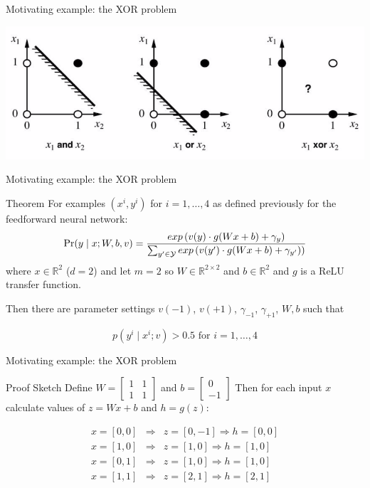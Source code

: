 \begin{frame}{Motivating example: the XOR problem}
\begin{block}{}
\includegraphics[scale=0.7]{figures/xorfig.png}
\end{block}
\end{frame}

\begin{frame}{Motivating example: the XOR problem}
\begin{block}{Theorem}
For examples $(x^i, y^i)$ for $i = 1,\ldots,4$ as defined previously for the feedforward neural network:
\[ \Pr(y \mid x; W, b, v) = \frac{exp\left(v(y) \cdot g(Wx + b) + \gamma_y \right)}{\sum_{y' \in {\cal Y}} exp\left(v(y') \cdot g(Wx + b) + \gamma_{y'})\right)} \]
where $x \in \mathbb{R}^2$ ($d=2$) and let $m=2$ so $W \in \mathbb{R}^{2\times2}$ and $b \in \mathbb{R}^2$ and $g$ is a ReLU transfer function.

\pause
Then there are parameter settings $v(-1)$, $v(+1)$, $\gamma_{-1}$, $\gamma_{+1}$, $W, b$ such that 

\[ p(y^i \mid x^i; v) > 0.5 \textrm{   for } i = 1, \ldots, 4 \]
\end{block}
\end{frame}

\begin{frame}{Motivating example: the XOR problem}
\begin{block}{Proof Sketch}
Define $W = \begin{bmatrix}
 1 & 1 \\
 1 & 1 
 \end{bmatrix}$ 
and $b = \begin{bmatrix} 0 \\ -1 \end{bmatrix}$
\pause
Then for each input $x$ calculate values of $z = Wx+b$ and $h=g(z)$:

\begin{eqnarray*}
x = [0,0] &\Rightarrow& z = [0,-1] \Rightarrow h = [0,0] \\
x = [1,0] &\Rightarrow& z = [1,0] \Rightarrow h = [1,0] \\
x = [0,1] &\Rightarrow& z = [1,0] \Rightarrow h = [1,0] \\
x = [1,1] &\Rightarrow& z = [2,1] \Rightarrow h = [2,1] 
\end{eqnarray*}
\end{block}
\end{frame}

